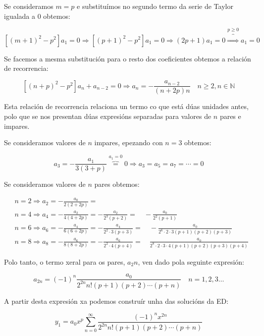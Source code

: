 \documentclass[a4paper,12pt,titlepage]{article}
\begin{document}
Se consideramos $m=p$ e substituímos no segundo termo da serie de Taylor igualada a 0 obtemos:

\begin{equation*}
    \left [(m+1)^{2}-p^{2}\right ] a_{1} = 0 \Rightarrow \left [(p+1)^{2}-p^{2}\right ] a_{1} = 0 \Rightarrow (2 p+1) a_{1}=0 \overbrace{\Rightarrow}^{p\geq 0} a_1=0
\end{equation*}

Se facemos a mesma substitución para o resto dos coeficientes obtemos a relación de recorrencia:

$$
\left[(n+p)^{2}-p^{2}\right] a_{n}+a_{n-2}=0 \Rightarrow a_{n}=-\frac{a_{n-2}}{(n+2 p) n} \quad n \geq 2, n \in \mathbb{N}
$$

Esta relación de recorrencia relaciona un termo co que está dúas unidades antes, polo que se nos presentan dúas expresións separadas para valores de $n$ pares e impares.

\par Se consideramos valores de $n$ impares, epezando con $n=3$ obtemos:

\begin{equation*}
    a_3 = -\frac{a_1}{3(3+p)} \overbrace{=}^{a_1=0} 0 \Rightarrow a_3=a_5=a_7 = \cdots = 0
\end{equation*}

Se consideramos valores de $n$ pares obtemos:

$$
\begin{aligned}
& n=2 \Rightarrow a_{2}=-\frac{a_{0}}{2(2+2 p)}= \\
& n=4 \Rightarrow a_{4}=-\frac{a_{2}}{4(4+2 p)}=-\frac{a_{2}}{2^{3}(p+2)}=\quad-\frac{a_{0}}{2^{2}(p+1)} \\
& n=6 \Rightarrow a_{6}=-\frac{a_{4}}{6(6+2 p)}=-\frac{a_{4}}{2^{2} \cdot 3(p+3)}=\quad-\frac{a_{0}}{2^{6} \cdot 2 \cdot 3(p+1)(p+2)(p+3)} \\
& n=8 \Rightarrow a_{8}=-\frac{a_{6}}{8(8+2 p)}=-\frac{a_{6}}{2^{2} \cdot 4(p+4)}=\quad \frac{a_{0}}{2^{8} \cdot 2 \cdot 3 \cdot 4(p+1)(p+2)(p+3)(p+4)}
\end{aligned}
$$

Polo tanto, o termo xeral para os pares, $a_2n$, ven dado pola seguinte expresión:

$$
a_{2 n}=(-1)^{n} \frac{a_{0}}{2^{2 n} n !(p+1)(p+2) \cdots(p+n)} \quad n=1,2,3 \ldots
$$

A partir desta expresión xa podemos construír unha das solucións da ED:

$$
y_{1}=a_{0} x^{p} \sum_{n=0}^{\infty} \frac{(-1)^{n} x^{2 n}}{2^{2 n} n !(p+1)(p+2) \cdots(p+n)}
$$
\end{document}
